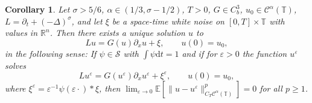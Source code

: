 \documentclass[11pt,a4paper]{article}
\newcommand{\mathd}{\mathrm{d}}
\newtheorem{corollary}[theorem]{Corollary}
\theoremstyle{remark}
\newcommand{\R}{\mathbb{R}}
\newcommand{\E}{\mathbb{E}}
\newcommand{\Lcal}{\mathcal{L}}
\newcommand{\CC}{\ensuremath{\mathscr{C}}}
\newcommand{\CS}{\ensuremath{\mathscr{S}}}
\begin{document}
\begin{corollary}
  Let $\sigma > 5/6$, $\alpha \in ( 1/3, \sigma -1/2 )$, $T>0$, $G \in C^3_b$, $u_0 \in \CC^\alpha(\mathbb{T})$, $L = \partial_t + (-\Delta)^\sigma$, and let $\xi$ be a space-time white noise on $[0,T] \times \mathbb{T}$ with values in $\R^n$. Then there exists a unique solution $u$ to
  \[
     L u = G(u) \partial_x u + \xi, \qquad u(0) = u_0,
  \]
  in the following sense: If $\psi \in \CS$ with $\int \psi \mathd t=1$ and if for $\varepsilon > 0$ the function $u^\varepsilon$ solves
  \[
     L u^\varepsilon = G(u^\varepsilon) \partial_x u^\varepsilon + \xi^\varepsilon, \qquad u(0) = u_0,
  \]
  where $\xi^\varepsilon = \varepsilon^{-1} \psi(\varepsilon \cdot) \ast \xi$, then $\lim_{\varepsilon \rightarrow 0} \E[\| u - u^\varepsilon \|_{C_T \CC^\alpha(\mathbb{T})}^p] = 0$ for all $p \ge 1$.
%  
%  
\end{corollary}
\end{document}
